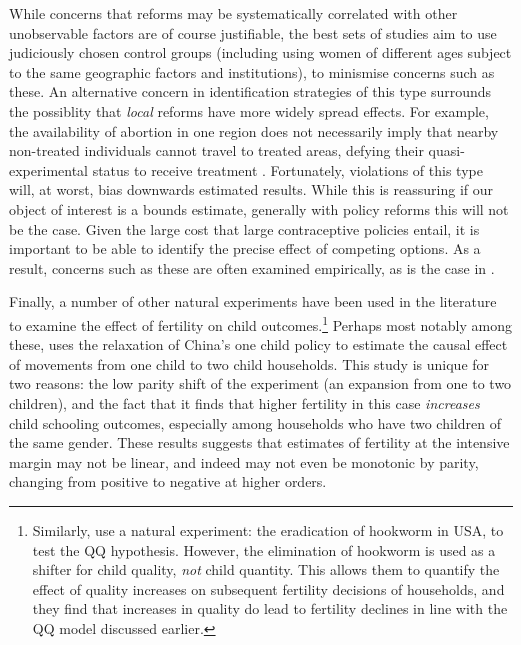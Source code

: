 \documentclass{article}
\begin{document}
\begin{spacing}{1.4}
While concerns that reforms may be systematically correlated with other 
unobservable factors are of course justifiable, the best sets of studies aim to 
use judiciously chosen control groups (including using women of different ages 
subject to the same geographic factors and institutions), to minismise concerns 
such as these. An alternative concern in identification strategies of this type 
surrounds the possiblity that \emph{local} reforms have more widely spread
effects.  For example, the availability of abortion in one region does not
necessarily imply that nearby non-treated individuals cannot travel to
treated areas, defying their quasi-experimental status to receive treatment 
\citep{Levineetal1999}. Fortunately, violations of this type will, at worst, 
bias downwards estimated results. While this is reassuring if our object of
interest is a bounds estimate, generally with policy reforms this will not be
the case.  Given the large cost that large contraceptive policies entail, it
is important to be able to identify the precise effect of competing options. 
As a result, concerns such as these are often examined empirically, as is the 
case in \citet{Christensen2012}.

Finally, a number of other natural experiments have been used in the 
literature to examine the effect of fertility on child outcomes.\footnote{
Similarly, \citet{BleakleyLange2009} use a natural experiment: the eradication
of hookworm in USA, to test the QQ hypothesis.  However, the elimination of
hookworm is used as a shifter for child quality, \emph{not} child quantity.
This allows them to quantify the effect of quality increases on subsequent
fertility decisions of households, and they find that increases in quality
do lead to fertility declines in line with the QQ model discussed earlier.}
Perhaps most notably among these, \citet{Qian2009} uses the relaxation of 
China's one child policy to estimate the causal effect of movements from one 
child to two child households.  This study is unique for two reasons: the low 
parity shift of the experiment (an expansion from one to two children), and the 
fact that it finds that higher fertility in this case \emph{increases} child 
schooling outcomes, especially among households who have two children of the 
same gender. These results suggests that estimates of fertility at the intensive 
margin may not be linear, and indeed may not even be monotonic by parity, 
changing from positive to negative at higher orders.


\end{spacing}
\end{document}
